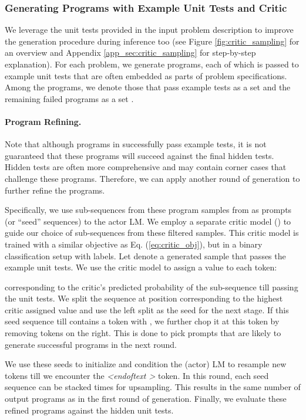 \documentclass{article}
\begin{document}
\subsubsection{Generating Programs with Example Unit Tests and Critic}
We leverage the unit tests provided in the input problem description to improve the generation procedure during inference too (see Figure \ref{fig:critic_sampling} for an overview and Appendix \ref{app_sec:critic_sampling} for step-by-step explanation).
For each problem, we generate  programs, each of which is passed to example unit tests that are often embedded as parts of problem specifications. 
Among the  programs, we denote those that pass example tests as a set  and the remaining failed programs as a set .

\paragraph{Program Refining.}
Note that although programs in  successfully pass example tests, it is not guaranteed that these programs will succeed against the final hidden tests. 
Hidden tests are often more comprehensive and may contain corner cases that challenge these programs. 
Therefore, we can apply another round of generation to further refine the programs.

Specifically, we use sub-sequences from these program samples from  as prompts (or ``seed'' sequences) to the actor LM. We employ a separate critic model () to guide our choice of sub-sequences from these filtered samples. This critic model is trained with a similar objective as Eq. (\ref{eq:critic_obj}), but in a binary classification setup with  labels.
Let  denote a generated sample that passes the example unit tests. We use the critic model to assign a value to each token:

corresponding to the critic's predicted probability of the sub-sequence till  passing the unit tests. 
We split the sequence at position  corresponding to the highest critic assigned value and use the left split as the seed for the next stage. 
If this seed sequence till  contains a token with   , we further chop it at this token by removing tokens on the right. This is done to pick prompts that are likely to generate successful programs in the next round.

We use these seeds to initialize and condition the (actor) LM to resample new tokens till we encounter the \emph{\textless endoftext \textgreater} token. 
In this round, each seed sequence can be stacked  times for upsampling. This results in the same number of output programs  as in the first round of generation.
Finally, we evaluate these  refined programs against the hidden unit tests.
\end{document}

